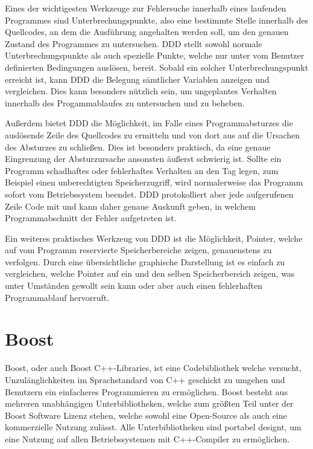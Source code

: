 Eines der wichtigesten Werkzeuge zur Fehlersuche innerhalb eines laufenden Programmes sind Unterbrechungspunkte, also eine bestimmte Stelle innerhalb des Quellcodes, an dem die Ausführung angehalten werden 
soll, um den genauen Zustand des Programmes zu untersuchen. DDD stellt sowohl normale Un\-ter\-brech\-ungs\-pun\-kte als auch spezielle Punkte, welche nur unter vom Benutzer definierten Bedingungen auslösen, bereit.
Sobald ein solcher Un\-ter\-brech\-ungs\-pun\-kt erreicht ist, kann DDD die Belegung sämtlicher Variablen anzeigen und vergleichen. Dies kann besonders nützlich sein, um ungeplantes Verhalten innerhalb des
Progamm\-ablaufes zu untersuchen und zu beheben. 

Außerdem bietet DDD die Möglichkeit, im Falle eines Programmabsturzes die auslösende Zeile des Quellcodes zu ermitteln und von dort aus auf die Ursachen des Absturzes zu schließen. Dies ist besonders
praktisch, da eine genaue Eingrenzung der Absturzursache ansonsten äußerst schwierig ist. Sollte ein Programm schadhaftes oder fehlerhaftes Verhalten an den Tag legen, zum Beispiel einen unberechtigten Speicherzugriff,
wird normalerweise das Programm sofort vom Betriebssystem beendet. DDD protokolliert aber jede aufgerufenen Zeile Code mit und kann daher genaue Auskunft geben, in welchem Programmabschnitt der
Fehler aufgetreten ist.

Ein weiteres praktisches Werkzeug von DDD ist die Möglichkeit, Pointer, welche auf vom Programm reservierte Speicherbereiche zeigen, genauenstens zu verfolgen. Durch eine übersichtliche graphische Darstellung
ist es einfach zu vergleichen, welche Pointer auf ein und den selben Speicherbereich zeigen, was unter Umständen gewollt sein kann oder aber auch einen fehlerhaften Programmablauf hervorruft.

\section{Boost}
\label{sec:boost}
Boost, oder auch Boost C++-Libraries, ist eine Codebibliothek welche versucht, Un\-zu\-läng\-lich\-keiten im Sprachstandard von C++ geschickt zu umgehen und Benutzern ein einfacheres Programmieren zu ermöglichen.
Boost besteht aus mehreren unabhängigen Unterbibliotheken, welche zum größten Teil unter der Boost Software Lizenz stehen, welche sowohl eine Open-Source als auch eine kommerzielle Nutzung zulässt. Alle
Unterbibliotheken sind portabel designt, um eine Nutzung auf allen Betriebssystemen mit C++-Compiler zu ermöglichen. 

